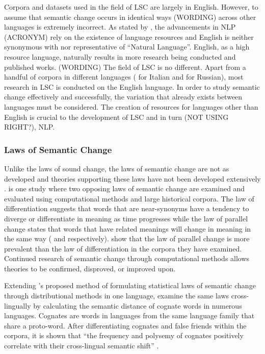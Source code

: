 Corpora and datasets used in the field of LSC are largely in English. However, to assume that semantic change occurs in identical ways (WORDING) across other languages is extremely incorrect. As stated by \citet{bender_2020}, the advancements in NLP (ACRONYM) rely on the existence of language resources and English is neither synonymous with nor representative of “Natural Language”. English, as a high resource language, naturally results in more research being conducted and published works. (WORDING) The field of LSC is no different. Apart from a handful of corpora in different languages (\citet{diacrita_evalita2020} for Italian and \citet{rushifteval2021} for Russian), most research in LSC is conducted on the English language. In order to study semantic change effectively and successfully, the variation that already exists between languages must be considered. The creation of resources for languages other than English is crucial to the development of LSC and in turn (NOT USING RIGHT?), NLP.   

\subsubsection{Laws of Semantic Change}
Unlike the laws of sound change, the laws of semantic change are not as developed and theories supporting these laws have not been developed extensively \citep{Xu2015ACE}. \citet{Xu2015ACE} is one study where two opposing laws of semantic change are examined and evaluated using computational methods and large historical corpora. The law of differentiation suggests that words that are near-synonyms have a tendency to diverge or differentiate in meaning as time progresses while the law of parallel change states that words that have related meanings will change in meaning in the same way (\citet{breal1897essai} and \citet{stern-1921} respectively). \citet{Xu2015ACE} show that the law of parallel change is more prevalent than the law of differentiation in the corpora they have examined. Continued research of semantic change through computational methods allows theories to be confirmed, disproved, or improved upon. 

Extending \citet{hamilton-etal-2016-diachronic}’s proposed method of formulating statistical laws of semantic change through distributional methods in one language, \citet{uban-etal-2019-studying} examine the same laws cross-lingually by calculating the semantic distance of cognate words in numerous languages. Cognates are words in languages from the same language family that share a proto-word. After differentiating cognates and false friends within the corpora, it is shown that “the frequency and polysemy of cognates positively correlate with their cross-lingual semantic shift” \citep{uban-etal-2019-studying}.


